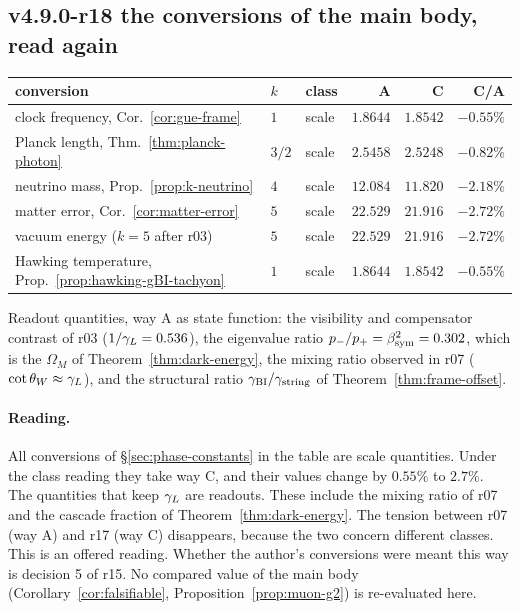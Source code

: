 \subsection*{v4.9.0-r18 the conversions of the main body, read again}
\label{subsec:v490-r18-main-body}

\begin{center}
\small
\begin{tabular}{@{}>{\raggedright\arraybackslash}p{}>{\raggedright\arraybackslash}p{}>{\raggedright\arraybackslash}p{}rrr@{}}
\toprule
conversion & \(k\) & class & A & C & C/A\\
\midrule
clock frequency, Cor.~\ref{cor:gue-frame} & \(1\) & scale & \(1.8644\) & \(1.8542\) & \(-0.55\%\)\\
Planck length, Thm.~\ref{thm:planck-photon} & \(3/2\) & scale & \(2.5458\) & \(2.5248\) & \(-0.82\%\)\\
neutrino mass, Prop.~\ref{prop:k-neutrino} & \(4\) & scale & \(12.084\) & \(11.820\) & \(-2.18\%\)\\
matter error, Cor.~\ref{cor:matter-error} & \(5\) & scale & \(22.529\) & \(21.916\) & \(-2.72\%\)\\
vacuum energy (\(k=5\) after r03) & \(5\) & scale & \(22.529\) & \(21.916\) & \(-2.72\%\)\\
Hawking temperature, Prop.~\ref{prop:hawking-gBI-tachyon} & \(1\) & scale & \(1.8644\) & \(1.8542\) & \(-0.55\%\)\\
\bottomrule
\end{tabular}
\end{center}
Readout quantities, way A as state function: the visibility and compensator contrast of r03 (\(1/\gamma_L=0.536\)), the eigenvalue
ratio \(p_-/p_+=\beta_{\mathrm{sym}}^2=0.302\), which is the \(\Omega_M\) of Theorem~\ref{thm:dark-energy}, the mixing ratio observed in r07
(\(\cot\theta_W\approx\gamma_L\)), and the structural ratio \(\gamma_{\mathrm{BI}}/\gamma_{\mathrm{string}}\) of Theorem~\ref{thm:frame-offset}.

\paragraph{Reading.}
All conversions of \S\ref{sec:phase-constants} in the table are scale quantities.  Under the class reading they take way C,
and their values change by \(0.55\%\) to \(2.7\%\).  The quantities that keep \(\gamma_L\) are readouts.  These include the mixing ratio
of r07 and the cascade fraction of Theorem~\ref{thm:dark-energy}.  The tension between r07 (way A) and r17 (way C) disappears,
because the two concern different classes.  This is an offered reading.  Whether the author's conversions were meant this way
is decision 5 of r15.  No compared value of the main body (Corollary~\ref{cor:falsifiable}, Proposition~\ref{prop:muon-g2}) is
re-evaluated here.

